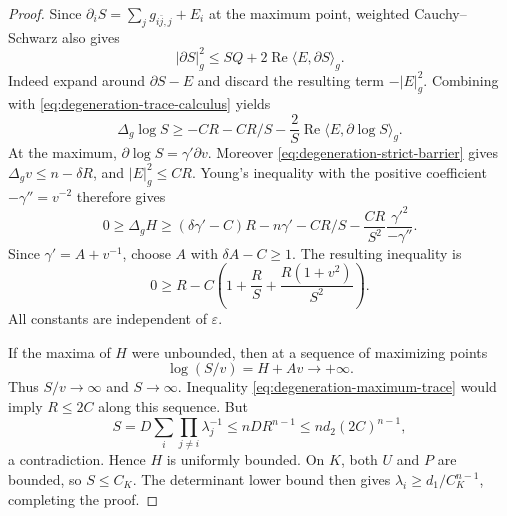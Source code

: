 \begin{proof}
Since $\partial_iS=\sum_jg_{i\bar j,j}+E_i$ at the maximum point, weighted Cauchy--Schwarz also gives
\[
 |\partial S|_g^2
 \leq SQ+2\operatorname{Re}\langle E,\partial S\rangle_g.
\]
Indeed expand around $\partial S-E$ and discard the resulting term $-|E|_g^2$. Combining with \eqref{eq:degeneration-trace-calculus} yields
\[
 \Delta_g\log S\geq-CR-CR/S
       -\frac2S\operatorname{Re}\langle E,\partial\log S\rangle_g.
\]
At the maximum, $\partial\log S=\gamma'\partial v$. Moreover \eqref{eq:degeneration-strict-barrier} gives $\Delta_gv\leq n-\delta R$, and $|E|_g^2\leq CR$. Young's inequality with the positive coefficient $-\gamma''=v^{-2}$ therefore gives
\[
 0\geq\Delta_g H
 \geq(\delta\gamma'-C)R-n\gamma'-CR/S
       -\frac{CR}{S^2}\frac{\gamma'^2}{-\gamma''}.
\]
Since $\gamma'=A+v^{-1}$, choose $A$ with $\delta A-C\geq1$. The resulting inequality is
\begin{equation}\label{eq:degeneration-maximum-trace}
 0\geq R-C\left(1+\frac RS+\frac{R(1+v^2)}{S^2}\right).
\end{equation}
All constants are independent of $\varepsilon$.

If the maxima of $H$ were unbounded, then at a sequence of maximizing points
\[
 \log(S/v)=H+Av\longrightarrow+\infty.
\]
Thus $S/v\to\infty$ and $S\to\infty$. Inequality \eqref{eq:degeneration-maximum-trace} would imply $R\leq2C$ along this sequence. But
\[
 S=D\sum_i\prod_{j\ne i}\lambda_j^{-1}
       \leq nDR^{n-1}\leq nd_2(2C)^{n-1},
\]
a contradiction. Hence $H$ is uniformly bounded. On $K$, both $U$ and $P$ are bounded, so $S\leq C_K$. The determinant lower bound then gives $\lambda_i\geq d_1/C_K^{n-1}$, completing the proof.
\end{proof}

